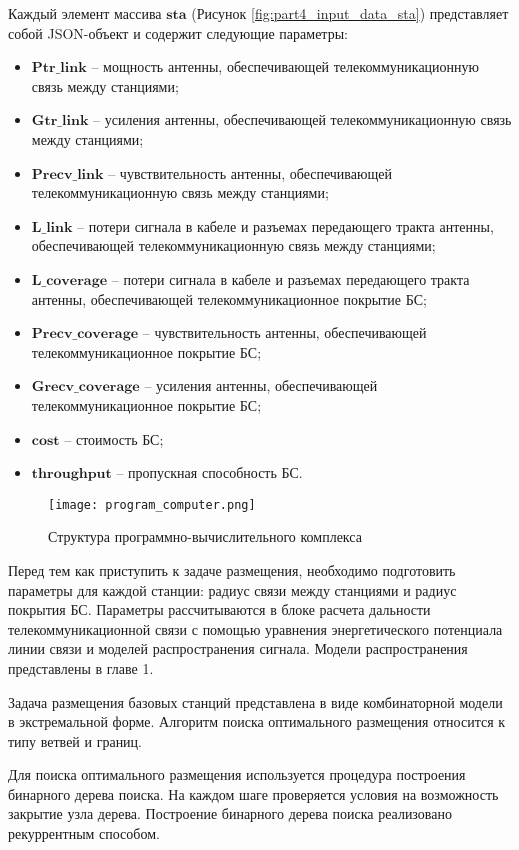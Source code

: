Каждый элемент массива $\textbf{sta}$ (Рисунок \cref{fig:part4_input_data_sta}) представляет собой JSON-объект и содержит следующие параметры:
\begin{itemize}
  \item $\textbf{Ptr\_link}$ -- мощность антенны, обеспечивающей телекоммуникационную связь между станциями;
  \item $\textbf{Gtr\_link}$ -- усиления антенны, обеспечивающей телекоммуникационную связь между станциями;
  \item $\textbf{Precv\_link}$ -- чувствительность антенны, обеспечивающей телекоммуникационную связь между станциями;
  \item $\textbf{L\_link}$ -- потери сигнала в кабеле и разъемах передающего тракта антенны, обеспечивающей телекоммуникационную связь между станциями;
  \item $\textbf{L\_coverage}$ -- потери сигнала в кабеле и разъемах передающего тракта антенны, обеспечивающей телекоммуникационное покрытие БС;
  \item $\textbf{Precv\_coverage}$ -- чувствительность антенны, обеспечивающей телекоммуникационное покрытие БС;
  \item $\textbf{Grecv\_coverage}$ -- усиления антенны, обеспечивающей телекоммуникационное покрытие БС;
  \item $\textbf{cost}$ -- стоимость БС;
  \item $\textbf{throughput}$ -- пропускная способность БС.
\end{itemize}



\begin{figure}[h!]
  \centering
   \texttt{[image: program\_computer.png]}
\caption{Структура программно-вычислительного комплекса}
\label{fig:part4_program_computer}
\end{figure}

Перед тем как приступить к задаче размещения, необходимо подготовить параметры для каждой станции: радиус связи между станциями и радиус покрытия БС. Параметры рассчитываются в блоке расчета дальности телекоммуникационной связи с помощью уравнения энергетического потенциала линии связи и моделей распространения сигнала. Модели распространения представлены в главе 1.


Задача размещения базовых станций представлена в виде комбинаторной модели в экстремальной форме. Алгоритм поиска оптимального размещения относится к типу ветвей и границ. 

Для поиска оптимального размещения используется процедура построения бинарного дерева поиска. На каждом шаге проверяется условия на возможность закрытие узла дерева. Построение бинарного дерева поиска реализовано рекуррентным способом.

